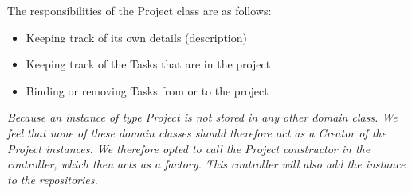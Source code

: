 			The responsibilities of the Project class are as follows:
			\begin{itemize}
			\item Keeping track of its own details (description)
			\item Keeping track of the Tasks that are in the project
			\item Binding or removing Tasks from or to the project
			\end{itemize}

			\emph{Because an instance of type Project is not stored in any other domain class. We feel that none of these domain classes should therefore act as a Creator of the Project instances. We therefore opted to call the Project constructor in the controller, which then acts as a factory. This controller will also add the instance to the repositories.}
			
